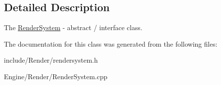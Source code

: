 \subsection{Detailed Description}
The \hyperlink{classEngine_1_1RenderSystem}{Render\+System} -\/ abstract / interface class. 

The documentation for this class was generated from the following files\+:\begin{DoxyCompactItemize}
\item 
include/\+Render/rendersystem.\+h\item 
Engine/\+Render/Render\+System.\+cpp\end{DoxyCompactItemize}
